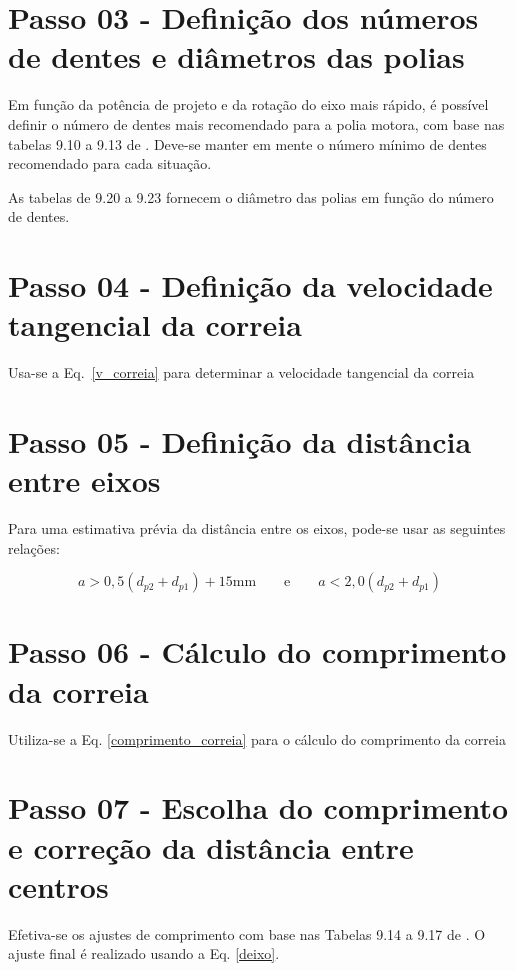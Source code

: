 \section{Passo 03 - Definição dos números de dentes e diâmetros das polias}

Em função da potência de projeto e da rotação do eixo mais rápido, é possível definir o número de dentes mais recomendado para a polia motora, com base nas tabelas 9.10 a 9.13 de \cite{EMA_Barbieri}. Deve-se manter em mente o número mínimo de dentes recomendado para cada situação.

As tabelas de \cite{EMA_Barbieri} 9.20 a 9.23 fornecem o diâmetro das polias em função do número de dentes.

\section{Passo 04 - Definição da velocidade tangencial da correia}

Usa-se a Eq.~\eqref{v_correia} para determinar a velocidade tangencial da correia


\section{Passo 05 - Definição da distância entre eixos}

Para uma estimativa prévia da distância entre os eixos, pode-se usar as seguintes relações:

\begin{equation}
    a > 0,5(d_{p2} + d_{p1}) +15\text{mm} \qquad \text{e} \qquad a<2,0(d_{p2} + d_{p1})
\end{equation}

\section{Passo 06 - Cálculo do comprimento da correia}

Utiliza-se a Eq. \eqref{comprimento_correia} para o cálculo do comprimento da correia

\section{Passo 07 - Escolha do comprimento e correção da distância entre centros}

Efetiva-se os ajustes de comprimento com base nas Tabelas 9.14 a 9.17 de \cite{EMA_Barbieri}. O ajuste final é realizado usando a Eq. \eqref{deixo}.

